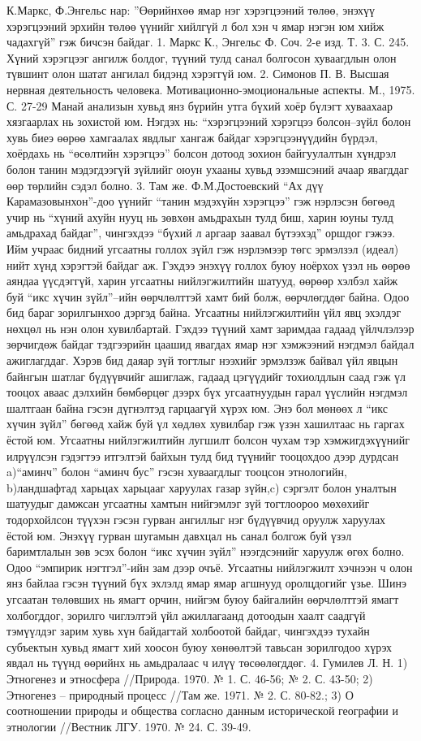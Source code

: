 К.Маркс, Ф.Энгельс нар: ”Өөрийнхөө ямар нэг хэрэгцээний төлөө, энэхүү хэрэгцээний эрхийн төлөө үүнийг хийлгүй л бол хэн ч ямар нэгэн юм хийж чадахгүй” гэж бичсэн байдаг. 1. Маркс К., Энгельс Ф. Соч. 2-е изд. Т. 3. С. 245.
Хүний хэрэгцээг ангилж болдог, түүний тулд санал болгосон хуваагдлын олон түвшинт олон шатат ангилал бидэнд хэрэггүй юм. 2. Симонов П. В. Высшая нервная деятельность человека. Мотивационно-эмоциональные аспекты. М., 1975. С. 27-29
Манай анализын хувьд янз бүрийн утга бүхий хоёр бүлэгт хуваахаар хязгаарлах нь зохистой юм. Нэгдэх нь: “хэрэгцээний хэрэгцээ болсон–зүйл болон хувь биеэ өөрөө хамгаалах явдлыг хангаж байдаг хэрэгцээнүүдийн бүрдэл, хоёрдахь нь “өсөлтийн хэрэгцээ” болсон дотоод зохион байгуулалтын хүндрэл болон танин мэдэгдээгүй зүйлийг оюун ухааны хувьд эзэмшсэний ачаар явагддаг өөр төрлийн сэдэл болно. 3. Там же.
Ф.М.Достоевский “Ах дүү Карамазовынхон”-доо үүнийг “танин мэдэхүйн хэрэгцээ” гэж нэрлэсэн бөгөөд учир нь “хүний ахуйн нууц нь зөвхөн амьдрахын тулд биш, харин юуны тулд амьдрахад байдаг”, чингэхдээ “бүхий л аргаар заавал бүтээхэд” оршдог гэжээ. Ийм учраас бидний угсаатны голлох зүйл гэж нэрлэмээр төгс эрмэлзэл (идеал) нийт хүнд хэрэгтэй байдаг аж. Гэхдээ энэхүү голлох буюу ноёрхох үзэл нь өөрөө аяндаа үүсдэггүй, харин угсаатны нийлэгжилтийн шатууд, өөрөөр хэлбэл хайж буй “икс хүчин зүйл”–ийн өөрчлөлттэй хамт бий болж, өөрчлөгддөг байна. Одоо бид бараг зорилгынхоо дэргэд байна.
Угсаатны нийлэгжилтийн үйл явц эхэлдэг нөхцөл нь нэн олон хувилбартай. Гэхдээ түүний хамт заримдаа гадаад үйлчлэлээр зөрчигдөж байдаг тэдгээрийн цаашид явагдах ямар нэг хэмжээний нэгдмэл байдал ажиглагддаг. Хэрэв бид даяар зүй тогтлыг нээхийг эрмэлзэж байвал үйл явцын байнгын шатлаг бүдүүвчийг ашиглаж, гадаад цэгүүдийг тохиолдлын саад гэж үл тооцох аваас дэлхийн бөмбөрцөг дээрх бүх угсаатнуудын гарал үүслийн нэгдмэл шалтгаан байна гэсэн дүгнэлтэд гарцаагүй хүрэх юм. Энэ бол мөнөөх л “икс хүчин зүйл” бөгөөд хайж буй үл хөдлөх хувилбар гэж үзэн хашилтаас нь гаргах ёстой юм.
Угсаатны нийлэгжилтийн лугшилт болсон чухам тэр хэмжигдэхүүнийг илрүүлсэн гэдэгтээ итгэлтэй байхын тулд бид түүнийг тооцохдоо дээр дурдсан a)“аминч” болон “аминч бус” гэсэн хуваагдлыг тооцсон этнологийн, b)ландшафтад харьцах харьцааг харуулах газар зүйн,c) сэргэлт болон уналтын шатуудыг дамжсан угсаатны хамтын нийгэмлэг зүй тогтлоороо мөхөхийг тодорхойлсон түүхэн гэсэн гурван ангиллыг нэг бүдүүвчид оруулж харуулах ёстой юм. Энэхүү гурван шугамын давхцал нь санал болгож буй үзэл баримтлалын зөв эсэх болон “икс хүчин зүйл” нээгдсэнийг харуулж өгөх болно.
Одоо “эмпирик нэгтгэл”-ийн зам дээр очъё. Угсаатны нийлэгжилт хэчнээн ч олон янз байлаа гэсэн түүний бүх эхлэлд ямар ямар агшнууд оролцдогийг үзье. Шинэ угсаатан төлөвших нь ямагт орчин, нийгэм буюу байгалийн өөрчлөлттэй ямагт холбогддог, зорилго чиглэлтэй үйл ажиллагаанд дотоодын хаалт саадгүй тэмүүлдэг зарим хувь хүн байдагтай холбоотой байдаг, чингэхдээ тухайн субъектын хувьд ямагт хий хоосон буюу хөнөөлтэй тавьсан зорилгодоо хүрэх явдал нь түүнд өөрийнх нь амьдралаас ч илүү төсөөлөгддөг. 4. Гумилев Л. Н. 1) Этногенез и этносфера //Природа. 1970. № 1. С. 46-56; № 2. С. 43-50; 2) Этногенез – природный процесс //Там же. 1971. № 2. С. 80-82.; 3) О соотношении природы и общества согласно данным исторической географии и этнологии //Вестник ЛГУ. 1970. № 24. С. 39-49.
